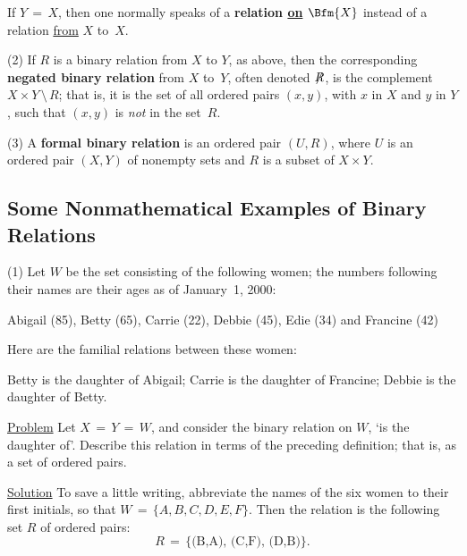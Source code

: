         If $Y \,=\, X$, then one normally speaks of a {\bf relation \underline{on} $\Bfm{X}$} instead of a relation \underline{from} $X$ to~$X$.

        (2) If $R$ is a binary relation from $X$ to $Y$, as above, then the corresponding
    {\bf negated binary relation} from $X$ to~$Y$, often denoted ${\not}R$,
    is the complement $X{\times}Y\,{\setminus}\,R$; that is, it is the set of all ordered pairs $(x,y)$, with $x$ in $X$ and $y$ in $Y$, such that $(x,y)$ is {\em not} in the set~$R$.

        (3) A {\bf formal binary relation} is an ordered pair $(U,R)$,
    where $U$ is an ordered pair $(X,Y)$ of nonempty sets and $R$ is a subset of $X{\times}Y$.

\VV

        \subsection{\small{{\bf Some Nonmathematical Examples of Binary Relations}}}
        \label{ExampA12.65A}

\V


        (1) Let $W$ be the set consisting of the following women; the numbers following their names are their ages as of January~1, 2000:

        \begin{center}
        Abigail (85), Betty (65), Carrie (22), Debbie (45), Edie (34) and Francine (42)
        \end{center}

        Here are the familial relations between these women:


        Betty is the daughter of Abigail; Carrie is the daughter of Francine; Debbie is the daughter of Betty.

        \underline{Problem} Let $X \,=\, Y \,=\, W$, and consider the binary relation on $W$, `is the daughter of'.
    Describe this relation in terms of the preceding definition; that is, as a set of ordered pairs.

        \underline{Solution} To save a little writing, abbreviate the names of the six women to their first initials, so that $W \,=\, \{A,B,C,D,E,F\}$.
    Then the relation is the following set $R$ of ordered pairs:
        \begin{displaymath}
        R \,=\, \mbox{\{(B,A), (C,F), (D,B)\}.}
        \end{displaymath}

